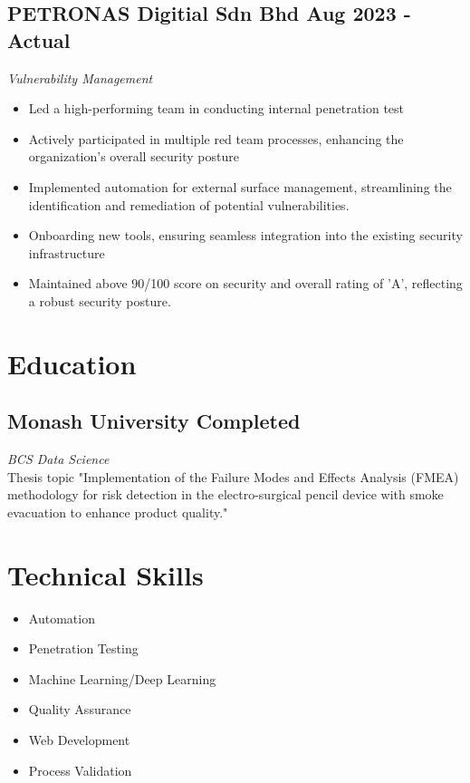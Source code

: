 \documentclass[a4paper,10pt]{article}
\begin{document}
	\subsection*{PETRONAS Digitial Sdn Bhd \hfill Aug 2023 - Actual}
	\textit{Vulnerability Management}
	\begin{itemize}
		\item Led a high-performing team in conducting internal penetration test
		\item Actively participated in multiple red team processes, enhancing the organization's overall security posture
		\item Implemented automation for external surface management, streamlining the identification and remediation of potential vulnerabilities.
		\item Onboarding new tools, ensuring seamless integration into the existing security infrastructure
		\item Maintained above 90/100 score on security and overall rating of 'A', reflecting a robust security posture.
	\end{itemize}
	
	\section*{ Education}
	
	\subsection*{Monash University \hfill Completed}
	\textit{BCS Data Science}\\
	Thesis topic "Implementation of the Failure Modes and Effects Analysis (FMEA) methodology for risk detection in the electro-surgical pencil device with smoke evacuation to enhance product quality."
	
	\section*{ Technical Skills}
	\begin{center}
		\begin{itemize}[label=, itemsep=-3pt]
			\item Automation
			\item Penetration Testing
			\item Machine Learning/Deep Learning
			\item Quality Assurance
			\item Web Development
			\item Process Validation
		\end{itemize}
	\end{center}
	
\end{document}
